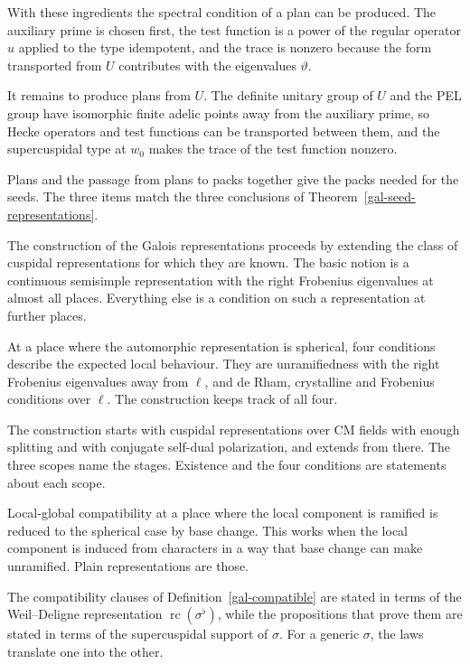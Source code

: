 With these ingredients the spectral condition of a plan can be produced. The auxiliary prime is chosen
first, the test function is a power of the regular operator $u$ applied to the type idempotent, and the
trace is nonzero because the form transported from $U$ contributes with the eigenvalues $\vartheta$.

It remains to produce plans from $U$. The definite unitary group of $U$ and the PEL group have
isomorphic finite adelic points away from the auxiliary prime, so Hecke operators and test functions can
be transported between them, and the supercuspidal type at $w_0$ makes the trace of the test function
nonzero.

Plans and the passage from plans to packs together give the packs needed for the seeds. The three items
match the three conclusions of Theorem~\ref{gal-seed-representations}.

The construction of the Galois representations proceeds by extending the class of cuspidal
representations for which they are known. The basic notion is a continuous semisimple representation
with the right Frobenius eigenvalues at almost all places. Everything else is a condition on such a
representation at further places.

At a place where the automorphic representation is spherical, four conditions describe the expected
local behaviour. They are unramifiedness with the right Frobenius eigenvalues away from $\ell$, and
de Rham, crystalline and Frobenius conditions over $\ell$. The construction keeps track of all four.

The construction starts with cuspidal representations over CM fields with enough splitting and with
conjugate self-dual polarization, and extends from there. The three scopes name the stages. Existence
and the four conditions are statements about each scope.

Local-global compatibility at a place where the local component is ramified is reduced to the
spherical case by base change. This works when the local component is induced from characters in a
way that base change can make unramified. Plain representations are those.

The compatibility clauses of Definition~\ref{gal-compatible} are stated in terms of the Weil--Deligne
representation $\operatorname{rc}(\sigma^\flat)$, while the propositions that prove them are stated in
terms of the supercuspidal support of $\sigma$. For a generic $\sigma$, the laws translate one into the
other.

